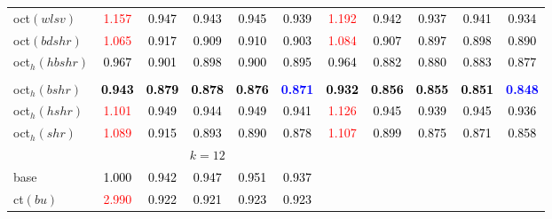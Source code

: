 \begin{tabular}[t]{l|>{}cccc>{}c|ccccc}
oct$(wlsv)$ & \textcolor{red}{1.157} & \textcolor{black}{0.947} & \textcolor{black}{0.943} & \textcolor{black}{0.945} & \textcolor{black}{0.939} & \textcolor{red}{1.192} & \textcolor{black}{0.942} & \textcolor{black}{0.937} & \textcolor{black}{0.941} & \textcolor{black}{0.934}\\
oct$(bdshr)$ & \textcolor{red}{1.065} & \textcolor{black}{0.917} & \textcolor{black}{0.909} & \textcolor{black}{0.910} & \textcolor{black}{0.903} & \textcolor{red}{1.084} & \textcolor{black}{0.907} & \textcolor{black}{0.897} & \textcolor{black}{0.898} & \textcolor{black}{0.890}\\
oct$_h(hbshr)$ & \textcolor{black}{0.967} & \textcolor{black}{0.901} & \textcolor{black}{0.898} & \textcolor{black}{0.900} & \textcolor{black}{0.895} & \textcolor{black}{0.964} & \textcolor{black}{0.882} & \textcolor{black}{0.880} & \textcolor{black}{0.883} & \textcolor{black}{0.877}\\[-1.5ex]
\hline\\[-1.5ex]
oct$_h(bshr)$ & \textcolor{black}{\textbf{0.943}} & \textcolor{black}{\textbf{0.879}} & \textcolor{black}{\textbf{0.878}} & \textcolor{black}{\textbf{0.876}} & \textcolor{blue}{\textbf{0.871}} & \textcolor{black}{\textbf{0.932}} & \textcolor{black}{\textbf{0.856}} & \textcolor{black}{\textbf{0.855}} & \textcolor{black}{\textbf{0.851}} & \textcolor{blue}{\textbf{0.848}}\\
oct$_h(hshr)$ & \textcolor{red}{1.101} & \textcolor{black}{0.949} & \textcolor{black}{0.944} & \textcolor{black}{0.949} & \textcolor{black}{0.941} & \textcolor{red}{1.126} & \textcolor{black}{0.945} & \textcolor{black}{0.939} & \textcolor{black}{0.945} & \textcolor{black}{0.936}\\
oct$_h(shr)$ & \textcolor{red}{1.089} & \textcolor{black}{0.915} & \textcolor{black}{0.893} & \textcolor{black}{0.890} & \textcolor{black}{0.878} & \textcolor{red}{1.107} & \textcolor{black}{0.899} & \textcolor{black}{0.875} & \textcolor{black}{0.871} & \textcolor{black}{0.858}\\
\addlinespace[0.3em]
\multicolumn{1}{c}{} & \multicolumn{5}{c}{\textbf{$k = 12$}} & \multicolumn{5}{c}{}\\
base & \textcolor{black}{1.000} & \textcolor{black}{0.942} & \textcolor{black}{0.947} & \textcolor{black}{0.951} & \textcolor{black}{0.937} &  &  &  &  & \\
ct$(bu)$ & \textcolor{red}{2.990} & \textcolor{black}{0.922} & \textcolor{black}{0.921} & \textcolor{black}{0.923} & \textcolor{black}{0.923} &  &  &  &  & \\

\end{tabular}
